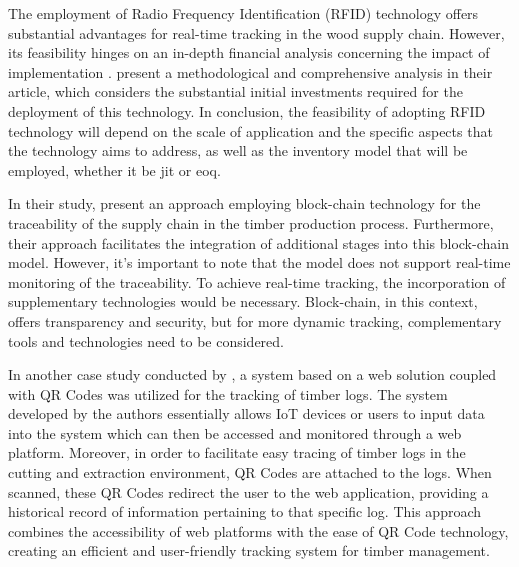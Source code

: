 The employment of Radio Frequency Identification (RFID) technology offers substantial advantages for real-time tracking in the wood supply chain. However, its feasibility hinges on an in-depth financial analysis concerning the impact of implementation \cite{Ustundag2007}. \textcite{Lee2012} present a methodological and comprehensive analysis in their article, which considers the substantial initial investments required for the deployment of this technology. In conclusion, the feasibility of adopting RFID technology will depend on the scale of application and the specific aspects that the technology aims to address, as well as the inventory model that will be employed, whether it be \acrfull{jit} or \acrfull{eoq}.

In their study, \textcite{hultgren2018blockchain} present an approach employing block-chain technology for the traceability of the supply chain in the timber production process. Furthermore, their approach facilitates the integration of additional stages into this block-chain model. However, it's important to note that the model does not support real-time monitoring of the traceability. To achieve real-time tracking, the incorporation of supplementary technologies would be necessary. Block-chain, in this context, offers transparency and security, but for more dynamic tracking, complementary tools and technologies need to be considered.

In another case study conducted by  \textcite{Amaya2022}, a system based on a web solution coupled with QR Codes was utilized for the tracking of timber logs. The system developed by the authors essentially allows IoT devices or users to input data into the system which can then be accessed and monitored through a web platform. Moreover, in order to facilitate easy tracing of timber logs in the cutting and extraction environment, QR Codes are attached to the logs. When scanned, these QR Codes redirect the user to the web application, providing a historical record of information pertaining to that specific log. This approach combines the accessibility of web platforms with the ease of QR Code technology, creating an efficient and user-friendly tracking system for timber management.

